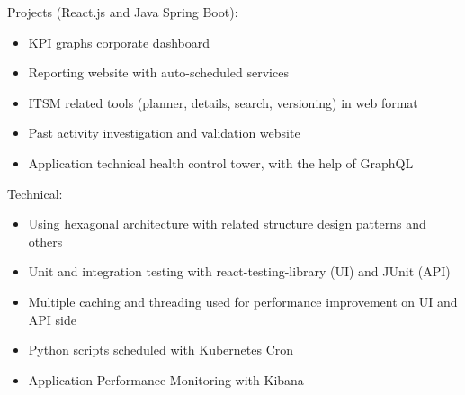 \documentclass[11pt,a4paper,ragged2e,withhyper]{altacv}
\begin{document}


\makecvheader


\vspace{-.5\baselineskip}
\begin{minipage}[t]{0.45\textwidth}
  \vspace{0pt}
Projects (React.js and Java Spring Boot):
\begin{itemize}
\item KPI graphs corporate dashboard
\item Reporting website with auto-scheduled services
\item ITSM related tools (planner, details, search, versioning) in web format
\item Past activity investigation and validation website
\item Application technical health control tower, with the help of GraphQL
\end{itemize}
\end{minipage}
\hfill
\begin{minipage}[t]{0.45\textwidth}
  \vspace{0pt}
 Technical:
\begin{itemize}
  \item Using hexagonal architecture with related structure design patterns and others
  \item Unit and integration testing with react-testing-library (UI) and JUnit (API)
  \item Multiple caching and threading used for performance improvement on UI and API side
  \item Python scripts scheduled with Kubernetes Cron
  \item Application Performance Monitoring with Kibana
\end{itemize}
\end{minipage}
\end{document}
